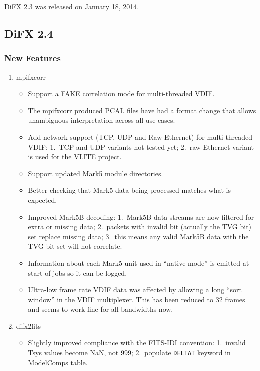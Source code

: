 DiFX 2.3 was released on January 18, 2014.


\subsection{DiFX 2.4}

\subsubsection{New Features}

\begin{enumerate}

\item mpifxcorr
\begin{itemize}
\item Support a FAKE correlation mode for multi-threaded VDIF.
\item The mpifxcorr produced PCAL files have had a format change that allows unambiguous interpretation across all use cases.
\item Add network support (TCP, UDP and Raw Ethernet) for multi-threaded VDIF:
1.\  TCP and UDP variants not tested yet;
2.\  raw Ethernet variant is used for the VLITE project.
\item Support updated Mark5 module directories.
\item Better checking that Mark5 data being processed matches what is expected.
\item Improved Mark5B decoding:
1.\ Mark5B data streams are now filtered for extra or missing data;
2.\ packets with invalid bit (actually the TVG bit) set replace missing data;
3.\ this means any valid Mark5B data with the TVG bit set will not correlate.
\item Information about each Mark5 unit used in ``native mode'' is emitted at start of jobs so it can be logged.
\item Ultra-low frame rate VDIF data was affected by allowing a long ``sort window'' in the VDIF multiplexer.  
This has been reduced to 32 frames and seems to work fine for all bandwidths now.
\end{itemize}

\item difx2fits
\begin{itemize}
\item Slightly improved compliance with the FITS-IDI convention:
1.\ invalid Tsys values become NaN, not 999;
2.\ populate {\tt DELTAT} keyword in ModelComps table.
\end{itemize}


\end{enumerate}
